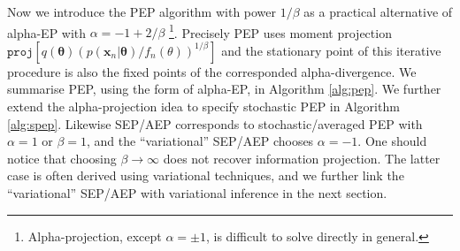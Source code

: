 \documentclass{article} %
\begin{document}
Now we introduce the PEP algorithm with power $1 / \beta$ as a practical alternative of alpha-EP with $\alpha = -1 + 2 / \beta$ \footnote{Alpha-projection, except $\alpha = \pm 1$, is difficult to solve directly in general.}. Precisely PEP uses moment projection $\mathtt{proj}[q(\bm{\theta}) (p(\bm{x}_n|\bm{\theta}) / f_n(\theta))^{1/\beta}]$ and the stationary point of this iterative procedure is also the fixed points of the corresponded alpha-divergence. 
%
We summarise PEP, using the form of alpha-EP, in Algorithm \ref{alg:pep}. We further extend the alpha-projection idea to specify stochastic PEP in Algorithm \ref{alg:spep}. Likewise SEP/AEP corresponds to stochastic/averaged PEP with $\alpha = 1$ or $\beta = 1$, and the ``variational'' SEP/AEP chooses $\alpha = -1$. One should notice that choosing $\beta \rightarrow \infty$ does not recover information projection. The latter case is often derived using variational techniques, and we further link the ``variational'' SEP/AEP with variational inference in the next section.
\end{document}
